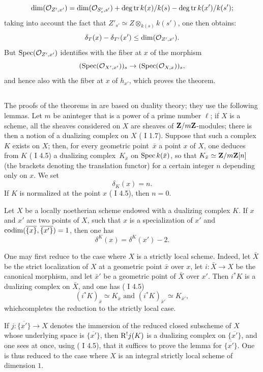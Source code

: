 $$
\dim(\mathcal O_{Z', x'})=\dim(\mathcal O_{S'_s, s'})+\operatorname{deg\,tr} k(x)/k(s)-\operatorname{deg\,tr} k(x')/k(s');$$
taking into account the fact that $Z'_{s'}\simeq Z\otimes_{k(s)}k(s')$, one then obtains:
$$
\delta_T(x)-\delta_{T'}(x')\leq\dim(\mathcal O_{Z', x'}).
$$
But $\operatorname{Spec}(\mathcal O_{Z', x'})$ identifies with the fiber at $x$ of the morphism
$$(\operatorname{Spec}(\mathcal O_{X', x'}))_s\to(\operatorname{Spec}(\mathcal O_{X, x}))_s,
$$
and hence also with the fiber at $x$ of $h_{x'}$, which proves the theorem.

\subsection{} \label{XIV.2.3}
The proofs of the theorems in \numero {} are based on duality theory; they use the following lemmas. Let $m$ be an\pageoriginale integer that is a power of a prime number $\ell$; if $X$ is a scheme, all the sheaves considered on $X$ are sheaves of $\mathbf Z/m\mathbf Z$-modules; there is then a notion of a dualizing complex on $X$ ( I 1.7). Suppose that such a complex $K$ exists on $X$; then, for every geometric point~$\bar x$  a point $x$ of $X$, one deduces from $K$ (\cf {} I 4.5) a dualizing complex~$K_{\bar x}$ on $\operatorname{Spec} k(\bar x)$, so that $K_{\bar x}\simeq\mathbf Z/m\mathbf Z[n]$ (the brackets denoting the translation functor) for a certain integer $n$ depending only on $x$. We set
$$
\delta_K(x)=n.
$$
If $K$ is normalized at the point $x$ ( I 4.5), then $n=0$.

\begin{sublemme} \label{XIV.2.3.1} Let $X$ be a locally noetherian scheme endowed with a dualizing complex $K$. If $x$ and $x'$ are two points of $X$, such that $x$ is a specialization of $x'$ and $\operatorname{codim}(\overline{\{x\}}, \overline{\{x'\}})=1$, then one has
$$
\delta^K(x)=\delta^{K}(x')-2.
$$
\end{sublemme}

One may first reduce to the case where $X$ is a strictly local scheme. Indeed, let $\bar X$ be the strict localization of $X$ at a geometric point $\bar x$ over $x$, let $i:\bar X\to X$ be the canonical morphism, and let $\bar x'$ be a geometric point of $\bar X$ over $x'$. Then $i^*K$ is a dualizing complex on $\bar X$, and one has ( I 4.5)
$$
(i^*K)_{\bar x}\simeq K_{\bar x}\text{ and } (i^*K)_{\bar x'}\simeq K_{\bar x'},
$$
which\pageoriginale completes the reduction to the strictly local case.

If $j:\overline{\{x'\}}\to X$ denotes the immersion of the reduced closed subscheme of $X$ whose underlying space is $\overline{\{x'\}}$, then $\mathrm R^!j(K)$ is a dualizing complex on $\overline{\{x'\}}$, and one sees at once, using ( I 4.5), that it suffices to prove the lemma for $\overline{\{x'\}}$. One is thus reduced to the case where $X$ is an integral strictly local scheme of dimension $1$.

